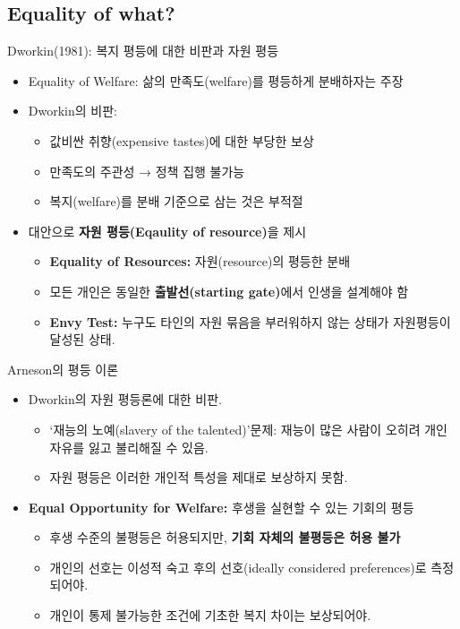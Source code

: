 \documentclass[aspectratio=169,xcolor=dvipsnames,handout]{beamer}
\begin{document}
\subsection{Equality of what?}
\begin{frame}{Dworkin(1981): 복지 평등에 대한 비판과 자원 평등}
  \begin{itemize}
    \item Equality of Welfare: 삶의 만족도(welfare)를 평등하게 분배하자는 주장
    \item Dworkin의 비판:
    \begin{itemize}
        \item 값비싼 취향(expensive tastes)에 대한 부당한 보상
        \item 만족도의 주관성 → 정책 집행 불가능
        \item 복지(welfare)를 분배 기준으로 삼는 것은 부적절
    \end{itemize}
    \item 대안으로 \textbf{자원 평등(Eqaulity of resource)}을 제시
    \begin{itemize}
        \item \textbf{Equality of Resources:} 자원(resource)의 평등한 분배
        \item 모든 개인은 동일한 \textbf{출발선(starting gate)}에서 인생을 설계해야 함
        \item \textbf{Envy Test:} 누구도 타인의 자원 묶음을 부러워하지 않는 상태가 자원평등이 달성된 상태.
    \end{itemize}
  \end{itemize}
\end{frame}

\begin{frame}{Arneson의 평등 이론}
  \begin{itemize}
        \item Dworkin의 자원 평등론에 대한 비판.
  \begin{itemize}
        \item ‘재능의 노예(slavery of the talented)’문제: 재능이 많은 사람이 오히려 개인 자유를 잃고 불리해질 수 있음.
        \item 자원 평등은 이러한 개인적 특성을 제대로 보상하지 못함.
  \end{itemize}
    \item \textbf{Equal Opportunity for Welfare:} 후생을 실현할 수 있는 기회의 평등
  \begin{itemize}
        \item 후생 수준의 불평등은 허용되지만, \textbf{기회 자체의 불평등은 허용 불가}
        \item 개인의 선호는 이성적 숙고 후의 선호(ideally considered preferences)로 측정되어야.
        \item 개인이 통제 불가능한 조건에 기초한 복지 차이는 보상되어야. 
  \end{itemize}
  \end{itemize}
\end{frame}
\end{document}

